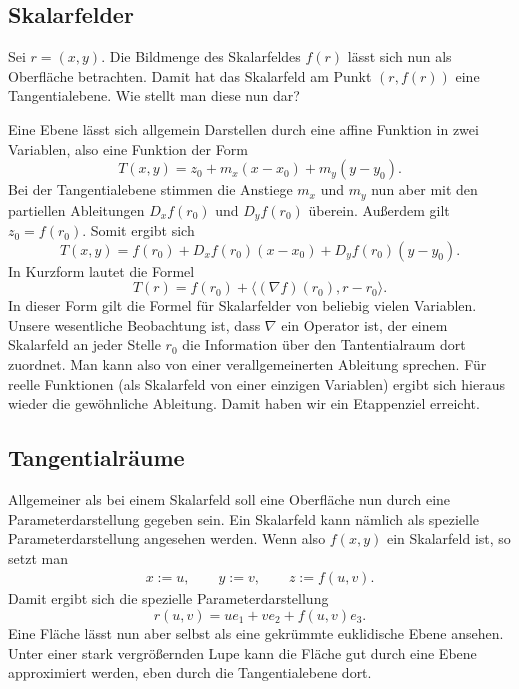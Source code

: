 \documentclass[a4paper,12pt,fleqn]{article}
\begin{document}
\subsection{Skalarfelder}
Sei $r=(x,y)$. Die Bildmenge des Skalarfeldes $f(r)$ lässt sich
nun als Oberfläche betrachten. Damit hat das Skalarfeld am
Punkt $(r,f(r))$ eine Tangentialebene. Wie stellt man diese
nun dar? 

Eine Ebene lässt sich allgemein Darstellen durch
eine affine Funktion in zwei Variablen, also eine Funktion der
Form
\[T(x,y) = z_0 + m_x (x-x_0)+ m_y (y-y_0).\]
Bei der Tangentialebene stimmen die Anstiege $m_x$ und $m_y$
nun aber mit den partiellen Ableitungen $D_x f(r_0)$ und $D_y f(r_0)$
überein. Außerdem gilt $z_0=f(r_0)$. Somit ergibt sich
\begin{equation}
T(x,y) = f(r_0)+D_xf(r_0)(x-x_0)+D_y f(r_0)(y-y_0).
\end{equation}
In Kurzform lautet die Formel
\begin{equation}
T(r) = f(r_0)+\langle (\nabla f)(r_0),r-r_0\rangle.
\end{equation}
In dieser Form gilt die Formel für Skalarfelder von beliebig
vielen Variablen. Unsere wesentliche Beobachtung ist, dass
$\nabla$ ein Operator ist, der einem Skalarfeld an jeder Stelle
$r_0$ die Information über den Tantentialraum dort zuordnet.
Man kann also von einer verallgemeinerten Ableitung sprechen. Für
reelle Funktionen (als Skalarfeld von einer einzigen Variablen)
ergibt sich hieraus wieder die gewöhnliche Ableitung.
Damit haben wir ein Etappenziel erreicht.

\subsection{Tangentialräume}

Allgemeiner als bei einem Skalarfeld soll eine Oberfläche nun
durch eine Parameterdarstellung gegeben sein. Ein Skalarfeld kann
nämlich als spezielle Parameterdarstellung angesehen werden.
Wenn also $f(x,y)$ ein Skalarfeld ist, so setzt man
\begin{gather*}
x:=u,\qquad y:=v,\qquad z:=f(u,v).
\end{gather*}
Damit ergibt sich die spezielle Parameterdarstellung
\begin{equation}
r(u,v) = ue_1+ve_2+f(u,v)e_3.
\end{equation}
Eine Fläche lässt nun aber selbst als eine gekrümmte euklidische
Ebene ansehen. Unter einer stark vergrößernden Lupe kann die
Fläche gut durch eine Ebene approximiert werden, eben durch die
Tangentialebene dort.
\end{document}
